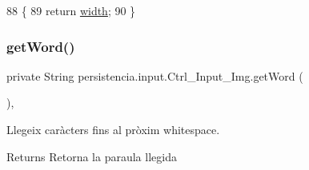 \begin{DoxyCode}
88                           \{
89         \textcolor{keywordflow}{return} \hyperlink{classpersistencia_1_1input_1_1Ctrl__Input__Img_a51dd0b9243b854aa25ac4532acca4524}{width};
90     \}
\end{DoxyCode}
\mbox{\label{classpersistencia_1_1input_1_1Ctrl__Input__Img_a17676e8616da5821ca2323da4691d240}} 
\subsubsection{\texorpdfstring{get\+Word()}{getWord()}}
{\footnotesize\ttfamily private String persistencia.\+input.\+Ctrl\+\_\+\+Input\+\_\+\+Img.\+get\+Word (\begin{DoxyParamCaption}{ }\end{DoxyParamCaption})\hspace{0.3cm}{\ttfamily [inline]}, {\ttfamily [private]}}



Llegeix caràcters fins al pròxim whitespace. 

\begin{DoxyReturn}{Returns}
Retorna la paraula llegida 
\end{DoxyReturn}

